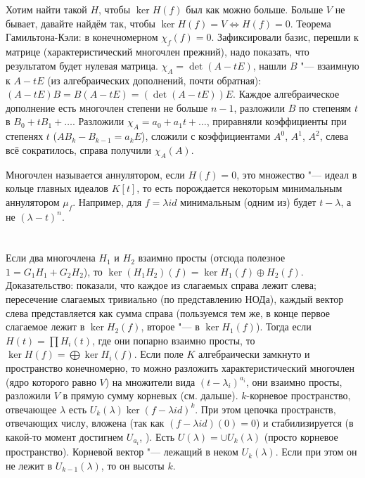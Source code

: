 \section{} %
Хотим найти такой $H$, чтобы $\ker H(f)$ был как можно больше.
Больше $V$ не бывает, давайте найдём так, чтобы $\ker H(f) = V \iff H(f) = 0$.
Теорема Гамильтона-Кэли: в конечномерном $\chi_f(f) = 0$.
Зафиксировали базис, перешли к матрице (характеристический многочлен прежний), надо показать, что результатом будет нулевая матрица.
$\chi_A=\det (A - tE)$, нашли $B$ "--- взаимную к $A-tE$ (из алгебраических дополнений, почти обратная): $(A-tE)B=B(A-tE)=(\det(A-tE))E$.
Каждое алгебраическое дополнение есть многочлен степени не больше $n-1$, разложили $B$ по степеням $t$ в $B_0+tB_1+\dots$.
Разложили $\chi_A=a_0+a_1t+\dots$, приравняли коэффициенты при степенях $t$ ($AB_k-B_{k-1}=a_kE$), сложили с коэффициентами $A^0$, $A^1$, $A^2$, слева всё сократилось,
справа получили $\chi_A(A)$.

Многочлен называется аннулятором, если $H(f) = 0$, это множество "--- идеал в кольце главных идеалов $K[t]$, то есть порождается некоторым минимальным аннулятором $\mu_f$.
Например, для $f=\lambda id$ минимальным (одним из) будет $t-\lambda$, а не $(\lambda - t)^n$.

\section{} %
Если два многочлена $H_1$ и $H_2$ взаимно просты (отсюда полезное $1=G_1H_1+G_2H_2$), то $\ker (H_1H_2)(f) = \ker H_1(f) \oplus H_2(f)$.
Доказательство:
показали, что каждое из слагаемых справа лежит слева;
пересечение слагаемых тривиально (по представлению НОДа),
каждый вектор слева представляется как сумма справа (пользуемся тем же, в конце первое слагаемое лежит в $\ker H_2(f)$, второе "--- в $\ker H_1(f)$).
Тогда если $H(t)=\prod H_i(t)$, где они попарно взаимно просты, то $\ker H(f) = \bigoplus \ker H_i(f)$.
Если поле $K$ алгебраически замкнуто и пространство конечномерно, то можно разложить характеристический многочлен (ядро которого равно $V$)
на множители вида $(t-\lambda_i)^{a_i}$, они взаимно просты, разложили $V$ в прямую сумму корневых (см. дальше).
$k$-корневое пространство, отвечающее $\lambda$ есть $U_k(\lambda) \ker (f-\lambda id)^k$.
При этом цепочка пространств, отвечающих числу, вложена (так как $(f-\lambda id)(0)=0$) и стабилизируется (в какой-то момент достигнем $U_{a_i}$, \TODO[почему]).
Есть $U(\lambda) = \cup U_k(\lambda)$ (просто корневое пространство).
Корневой вектор "--- лежащий в неком $U_k(\lambda)$.
Если при этом он не лежит в $U_{k-1}(\lambda)$, то он высоты $k$.

